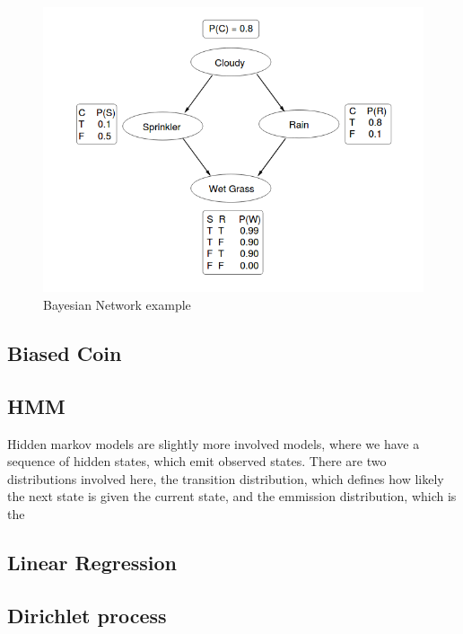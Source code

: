 \begin{figure}[!htb]
    \centering
    \includegraphics[width=\textwidth]{figs/sprinkler-network.png}
    \caption{Bayesian Network example}
    \label{fig:sprinkler-network}
\end{figure}

\subsection{Biased Coin}

\subsection{HMM}
Hidden markov models are slightly more involved models, where we have a sequence of hidden states, which emit observed states. There are two distributions involved here, the transition distribution, which defines how likely the next state is given the current state, and the emmission distribution, which is the 

\subsection{Linear Regression}

\subsection{Dirichlet process}

